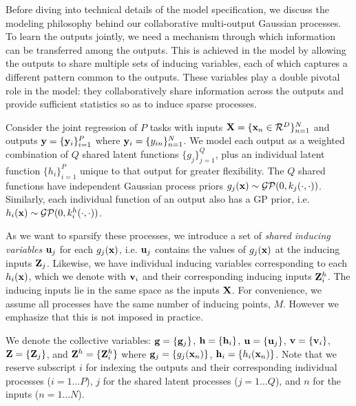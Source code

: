 Before diving into technical details of the model specification, 
we discuss the modeling philosophy behind our collaborative multi-output Gaussian processes.
To learn the outputs jointly, we need a mechanism through which information can be transferred among the outputs.
This is achieved in the model by allowing the outputs to share multiple sets of inducing variables, 
each of which captures a different pattern common to the outputs.
These variables  play a double pivotal role in the model: they collaboratively share  information 
across the outputs and  provide sufficient statistics so as to induce sparse processes. 

\newcommand{\Zj}{\Z_j}
\newcommand{\Zhi}{\Z^h_i}
Consider the joint regression of $P$ tasks with inputs $\mathbf{X} = \{\mathbf{x}_n \in \mathcal{R}^D\}_{n=1}^N$ and outputs $\mathbf{y} = \{\mathbf{y}_i\}_{i=1}^P$ where $\mathbf{y}_i = \{y_{in}\}_{n=1}^N$.
We  model each output as a weighted combination of $Q$ shared latent functions $\{ g_{j}\}_{j=1}^{Q}$, plus an individual latent 
function $\{ h_{i}\}_{i=1}^{P}$ unique to that output for greater flexibility.
The $Q$ shared functions have independent Gaussian process priors  $g_j(\mathbf{x}) \sim \mathcal{GP}(0, k_j(\cdot,\cdot))$. %
Similarly, each individual function of an output also has a GP prior, i.e.~$h_i(\mathbf{x}) \sim \mathcal{GP}(0, k^h_i(\cdot,\cdot))$. %


As we want to sparsify these processes, 
we introduce a set of \emph{shared inducing variables} $\mathbf{u}_j$ for  each $g_j(\mathbf{x})$, i.e. $\mathbf{u}_j$ contains the values of 
$g_j(\mathbf{x})$ at the inducing inputs $\mathbf{Z}_j$. Likewise, we have 
individual inducing variables corresponding to each  $h_i(\mathbf{x})$,  which we denote with $\mathbf{v}_i$ and their 
corresponding inducing inputs $\Zhi$.
%
The inducing inputs lie in the same space as the inputs $\mathbf{X}$.
For convenience, we  assume all processes have the same number of inducing points, $M$.
However we emphasize that this is not
 imposed in practice.


We denote the collective variables: $\mathbf{g} = \{\mathbf{g}_j\}$, $\mathbf{h} = \{\mathbf{h}_i \}$, $\mathbf{u} = \{\mathbf{u}_j\}$, $\mathbf{v} = \{\mathbf{v}_i\}$, $\Z = \{\Zj\}$, and $\Z^h = \{\Zhi \}$ where $\mathbf{g}_j = \{g_j(\mathbf{x}_n)\}$, $\mathbf{h}_i = \{h_i(\mathbf{x}_n)\}$. 
Note that we reserve subscript $i$ for indexing the outputs and their corresponding individual processes ($i = 1 \hdots P$), $j$ for the shared latent processes ($j = 1 \hdots Q$), and $n$ for the inputs ($n = 1 \hdots N$).
%
